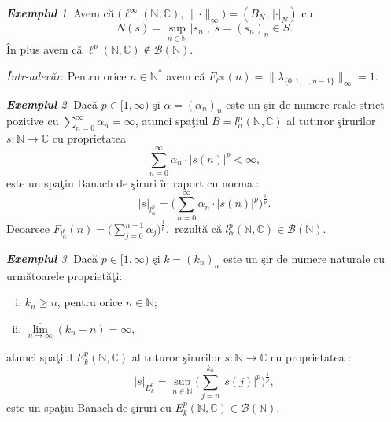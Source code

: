 \documentclass[ a4paper, 12pt]{report}
\theoremstyle{definition}
\theoremstyle{remark}
\newtheorem{exemple}{\bf Exemplul}[section]
\numberwithin{equation}{section}
\begin{document}
\begin{exemple}
Avem c\u a $\big(\ell^\infty(\mathbb{N},\mathbb{C}), \, \lVert \cdot \rVert_\infty) = (B_N, \, \lvert\cdot \rvert_N)$ cu
$$N(s)=\sup\limits_{n \in \mathbb{N}}\lvert s_n \rvert, \; s = (s_n)_n \in S.$$
\^ In plus avem c\u a $\ell^p(\mathbb{N},\mathbb{C}) \notin \mathcal{B}(\mathbb{N})$.
\end{exemple}

{\it \^ Intr-adev\u ar}: Pentru orice $n \in \mathbb{N}^*$ avem c\u a $F_{\ell^\infty}(n) = \lVert \lambda_{\{ 0, 1, \ldots, n - 1\}}\rVert_\infty = 1$.

\begin{exemple}
Dac\u a $p \in [1,\infty)$ \c si $\alpha = (\alpha_{n})_n$ este un \c sir de numere reale strict pozitive cu $\sum\limits_{n=0}^{\infty} \alpha_n = \infty$, atunci spa\c tiul $B = l_\alpha^p(\mathbb{N},\mathbb{C})$ al tuturor \c sirurilor $s : \mathbb{N} \rightarrow \mathbb{C}$ cu proprietatea
$$\sum\limits_{n=0}^{\infty} \alpha_n \cdot \lvert s(n) \rvert^p < \infty,$$ este un spa\c tiu Banach de \c siruri \^in raport cu norma :
\[ \lvert s \rvert_{l_{\alpha}^{p}} = \Big(\sum\limits_{n=0}^{\infty} \alpha_n \cdot \lvert s(n) \rvert^p\Big)^{\frac{1}{p}}.\]
Deoarece $F_{l_{\alpha}^{p}}(n) = \Big(\sum\limits_{j=0}^{n-1} \alpha_j\Big)^{\frac{1}{p}} ,$
rezult\u a c\u a $l_{\alpha}^{p}(\mathbb{N},\mathbb{C}) \in \mathcal{B}(\mathbb{N}).$
\end{exemple}
\begin{exemple}
Dac\u a $p\in [1,\infty)$ \c si $k = (k_n)_n$ este un \c sir de numere naturale cu urm\u atoarele propriet\u a\c ti:
\begin{enumerate}[(i)]
\item $k_n \geq n$, pentru orice $n \in \mathbb{N};$
\item $\overline{\lim\limits_{n \rightarrow \infty}}(k_n - n) = \infty,$
\end{enumerate} atunci spa\c tiul $E_{k}^{p}(\mathbb{N},\mathbb{C})$ al tuturor \c sirurilor $s : \mathbb{N} \rightarrow \mathbb{C}$ cu proprietatea :
\[ \lvert s \rvert_{E_{k}^{p}} = \sup\limits_{n \in \mathbb{N}}\Big(\sum\limits_{j=n}^{k_n}\lvert s(j) \rvert^{p}\Big)^{\frac{1}{p}},\] este un spa\c tiu Banach de \c siruri cu $E_{k}^{p}(\mathbb{N},\mathbb{C}) \in \mathcal{B}(\mathbb{N}).$
\end{exemple}
\end{document}
